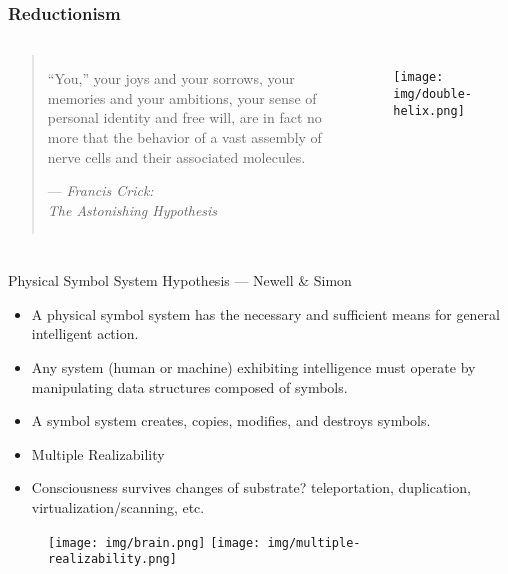 \documentclass[UTF8,11pt,colorlinks,compress,openany]{beamer}%
\begin{document}
\begin{frame}\frametitle{Reductionism}
\begin{columns}
\begin{quote}
	``You,'' your joys and your sorrows, your memories and your ambitions, your sense of personal identity and free will, are in fact no more that the behavior of a vast assembly of nerve cells and their associated molecules.\par
	\hfill --- \textsl{Francis Crick:\\ The Astonishing Hypothesis}
\end{quote}
\begin{figure}[H]
\texttt{[image: img/double-helix.png]}
\end{figure}
\end{columns}
\end{frame}

\begin{frame}\frametitle{}
\begin{block}{Physical Symbol System Hypothesis --- Newell \& Simon}
\begin{itemize}
	\item A physical symbol system has the necessary and sufficient means for general intelligent action.
	\item Any system (human or machine) exhibiting intelligence must operate by manipulating data structures composed of symbols.
	\item A symbol system creates, copies, modifies, and destroys symbols.
	\item Multiple Realizability
	\item Consciousness survives changes of substrate? teleportation, duplication, virtualization/scanning, etc.
\end{itemize}
\end{block}
\begin{figure}[H]
\texttt{[image: img/brain.png]}
\texttt{[image: img/multiple-realizability.png]}
\end{figure}
\end{frame}
\end{document}
